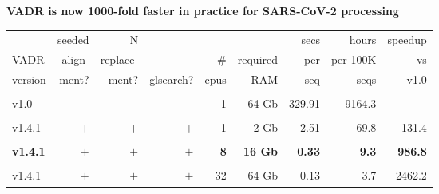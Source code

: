 \documentclass[landscape]{slides}
\begin{document}
\begin{slide}
\begin{center}
\normalsize{\textbf{VADR is now 1000-fold faster in practice for SARS-CoV-2 processing}}

\scriptsize
\begin{tabular}{lrrrrrrrr}
            &seeded      &N           &            &            &            &secs        &hours       &speedup     \\ 
VADR        &align-      &replace-    &            &\#          &required    &per         &per 100K    &vs          \\ 
version     &ment?       &ment?       &glsearch?   &cpus        &RAM         &seq         &seqs        &v1.0        \\ 
\hline
& & & & & & & & \\
v1.0         &$-$         &$-$         &$-$         &1           &64 Gb       &329.91      &9164.3      &-           \\
& & & & & & & & \\
v1.4.1       &$+$         &$+$         &$+$         &1           &2 Gb        &2.51        &69.8        &131.4       \\
& & & & & & & & \\
\textbf{v1.4.1}&\textbf{$+$}&\textbf{$+$}&\textbf{$+$}&\textbf{8}  &\textbf{16 Gb}&\textbf{0.33}&\textbf{9.3}&\textbf{986.8}\\
& & & & & & & & \\
v1.4.1       &$+$         &$+$         &$+$         &32          &64 Gb       &0.13        &3.7         &2462.2      \\
\end{tabular}
\end{center}

\vfill
\end{slide}
\end{document}
